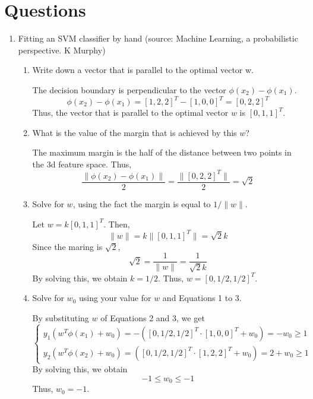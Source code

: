 

\oddsidemargin 0in
\evensidemargin 0in
\textwidth 6.5in
\topmargin -0.5in
\textheight 9.0in




\pagestyle{myheadings}  %

\section{Questions}

\begin{enumerate}
\item Fitting an SVM classifier by hand (source: Machine Learning, a probabilistic perspective. K Murphy)

\begin{enumerate}
\item Write down a vector that is parallel to the optimal vector w.

The decision boundary is perpendicular to the vector $\phi(x_2)-\phi(x_1)$.
\[
\phi(x_2)-\phi(x_1)=[1, 2, 2]^T-[1, 0, 0]^T=[0, 2, 2]^T
\]
Thus, the vector that is parallel to the optimal vector $w$ is $[0, 1, 1]^T$.

\item What is the value of the margin that is achieved by this $w$?

The maximum margin is the half of the distance between two points in the 3d feature space. Thus,
\[
\frac{\|\phi(x_2)-\phi(x_1)\|}{2}=\frac{\|[0, 2, 2]^T\|}{2}=\sqrt{2}
\]

\item Solve for $w$, using the fact the margin is equal to $1/\|w\|$.

Let $w=k [0, 1, 1]^T$. Then,
\[
\|w\|=k\|[0, 1, 1]^T\|=\sqrt{2}k
\]
Since the maring is $\sqrt{2}$,
\[
\sqrt{2}=\frac{1}{\|w\|}=\frac{1}{\sqrt{2}k}
\]
By solving this, we obtain $k=1/2$. Thus, $w=[0, 1/2, 1/2]^T$.

\item Solve for $w_0$ using your value for $w$ and Equations 1 to 3.

By substituting $w$ of Equations 2 and 3, we get
\[
\begin{cases}
y_1(w^T\phi(x_1)+w_0)=-([0, 1/2, 1/2]^T \cdot [1, 0, 0]^T+w_0)=-w_0\ge 1 \\
y_2(w^T\phi(x_2)+w_0)=([0,1/2,1/2]^T \cdot [1, 2, 2]^T+w_0)=2+w_0\ge 1
\end{cases}
\]
By solving this, we obtain
\[
-1\le w_0 \le -1
\]
Thus, $w_0=-1$.


\end{enumerate}
\end{enumerate}
